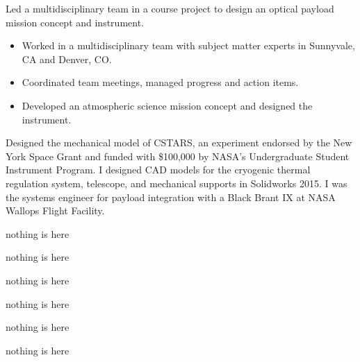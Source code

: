 \documentclass[10pt,final,sans]{resume}
\begin{document}
Led a multidisciplinary team in a course project to design an optical payload mission concept and instrument.
\begin{itemize}
  \item Worked in a multidisciplinary team with subject matter experts in Sunnyvale, CA and Denver, CO. 
  \item Coordinated team meetings, managed progress and action items.
  \item Developed an atmospheric science mission concept and designed the instrument.
\end{itemize}

Designed the mechanical model of CSTARS, an experiment endorsed by the New York Space Grant and funded with \$100,000 by NASA's Undergraduate Student Instrument Program. I designed CAD models for the cryogenic thermal regulation system, telescope, and mechanical supports in Solidworks 2015. I was the systems engineer for payload integration with a Black Brant IX at NASA Wallops Flight Facility.

nothing is here

nothing is here

nothing is here

nothing is here

nothing is here

nothing is here
\end{document}
